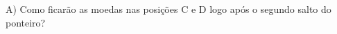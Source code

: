 \documentclass[preview]{standalone}
\begin{document}
\begin{center}
A) Como ficarão as moedas nas posições C e D logo após o segundo salto do ponteiro?
\end{center}
\end{document}
